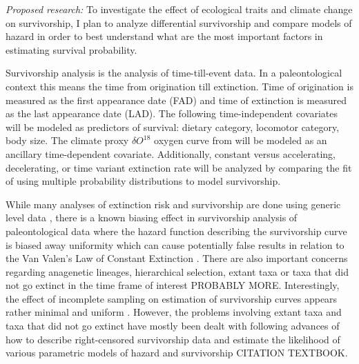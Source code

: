 \documentclass[12pt,letterpaper]{article}
\begin{document}
\textit{Proposed research:}
To investigate the effect of ecological traits and climate change on survivorship, I plan to analyze differential survivorship and compare models of hazard in order to best understand what are the most important factors in estimating survival probability.

Survivorship analysis is the analysis of time-till-event data. In a paleontological context this means the time from origination till extinction. Time of origination is measured as the first appearance date (FAD) and time of extinction is measured as the last appearance date (LAD). The following time-independent covariates will be modeled as predictors of survival: dietary category, locomotor category, body size. The climate proxy \(\delta O^{18}\) oxygen curve from \citet{Zachos2008} will be modeled as an ancillary time-dependent covariate. Additionally, constant versus accelerating, decelerating, or time variant extinction rate will be analyzed by comparing the fit of using multiple probability distributions to model survivorship.



While many analyses of extinction risk and survivorship are done using generic level data \citep{Tomiya2013,Liow2008,Harnik2013}, there is a known biasing effect in survivorship analysis of paleontological data where the hazard function describing the survivorship curve is biased away uniformity \citep{Raup1975,Sepkoski1975} which can cause potentially false results in relation to the Van Valen's Law of Constant Extinction \citep{VanValen1973}. There are also important concerns regarding anagenetic lineages, hierarchical selection, extant taxa or taxa that did not go extinct in the time frame of interest \citep{Raup1975,VanValen1979,Simpson2006,Raup1991a} PROBABLY MORE. Interestingly, the effect of incomplete sampling on estimation of survivorship curves appears rather minimal and uniform \citep{Sepkoski1975}. However, the problems involving extant taxa and taxa that did not go extinct have mostly been dealt with following advances of how to describe right-censored survivorship data and estimate the likelihood of various parametric models of hazard and survivorship CITATION TEXTBOOK. 
\end{document}
